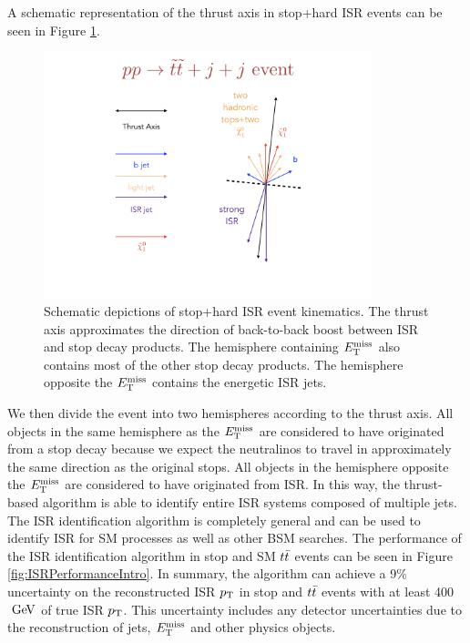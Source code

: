\indent A schematic representation of the thrust axis in stop+hard ISR events can be seen in Figure \ref{fig:ISR:ttbar_sig_example}. \\

\begin{figure}[h!]
  \centering
	\includegraphics[width=0.85\textwidth]{./figures/strategy/ISR_signal.png}
	\caption[Schematic depictions of stop plus hard initial state radiation event kinematics]{Schematic depictions of stop+hard ISR event kinematics.  The thrust axis approximates the direction of back-to-back boost between ISR and stop decay products.  The hemisphere containing $E_{\mathrm{T}}^{\mathrm{miss}}$ also contains most of the other stop decay products.  The hemisphere opposite the $E_{\mathrm{T}}^{\mathrm{miss}}$ contains the energetic ISR jets. }
	\label{fig:ISR:ttbar_sig_example}
\end{figure}

\indent We then divide the event into two hemispheres according to the thrust axis.  All objects in the same hemisphere as the $E_{\mathrm{T}}^{\mathrm{miss}}$ are considered to have originated from a stop decay because we expect the neutralinos to travel in approximately the same direction as the original stops.  All objects in the hemisphere opposite the $E_{\mathrm{T}}^{\mathrm{miss}}$ are considered to have originated from ISR.  In this way, the thrust-based algorithm is able to identify entire ISR systems composed of multiple jets.  \\ 

\indent The ISR identification algorithm is completely general and can be used to identify ISR for SM processes as well as other BSM searches.  The performance of the ISR identification algorithm in stop and SM $t\bar{t}$ events can be seen in Figure \ref{fig:ISRPerformanceIntro}.  In summary, the algorithm can achieve a 9\% uncertainty on the reconstructed ISR $p_{\mathrm{T}}$ in stop and $t\bar{t}$ events with at least 400 $\gev$ of true ISR $p_{\mathrm{T}}$. This uncertainty includes any detector uncertainties due to the reconstruction of jets, $E_{\mathrm{T}}^{\mathrm{miss}}$ and other physics objects.  \\

